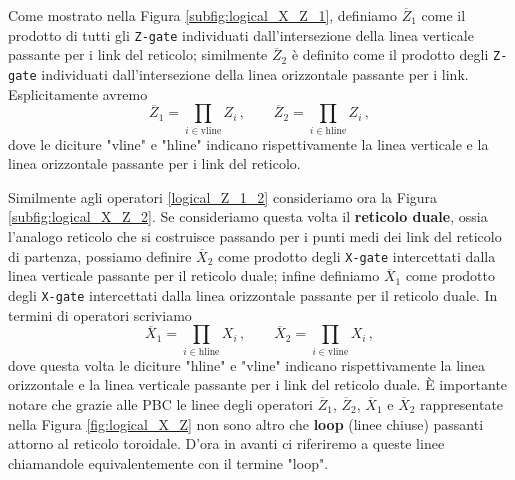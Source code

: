 \noindent Come mostrato nella Figura \ref{subfig:logical_X_Z_1}, definiamo $\overline{Z}_1$ come il prodotto di tutti gli \texttt{Z-gate} individuati dall'intersezione della linea verticale passante per i link del reticolo; similmente $\overline{Z}_2$ è definito come il prodotto degli \texttt{Z-gate} individuati dall'intersezione della linea orizzontale passante per i link. Esplicitamente avremo
\begin{equation}\label{logical_Z_1_2}
    \overline{Z}_1 = \prod_{i \in \text{vline}} Z_i \, , \qquad \overline{Z}_2 = \prod_{i \in \text{hline}} Z_i \, ,
\end{equation}
dove le diciture "vline" e "hline" indicano rispettivamente la linea verticale e la linea orizzontale passante per i link del reticolo. 

\noindent Similmente agli operatori \eqref{logical_Z_1_2} consideriamo ora la Figura \ref{subfig:logical_X_Z_2}. Se consideriamo questa volta il \textbf{reticolo duale}, ossia l'analogo reticolo che si costruisce passando per i punti medi dei link del reticolo di partenza, possiamo definire $\overline{X}_2$ come prodotto degli \texttt{X-gate} intercettati dalla linea verticale passante per il reticolo duale; infine definiamo $\overline{X}_1$ come prodotto degli \texttt{X-gate} intercettati dalla linea orizzontale passante per il reticolo duale. In termini di operatori scriviamo
\begin{equation}\label{logical_X_1_2}
    \overline{X}_1 = \prod_{i \in \text{hline}} X_i \, , \qquad \overline{X}_2 = \prod_{i \in \text{vline}} X_i \, ,
\end{equation}
dove questa volta le diciture "hline" e "vline" indicano rispettivamente la linea orizzontale e la linea verticale passante per i link del reticolo duale. È importante notare che grazie alle PBC le linee degli operatori $\overline{Z}_1$, $\overline{Z}_2$, $\overline{X}_1$ e $\overline{X}_2$ rappresentate nella Figura \ref{fig:logical_X_Z} non sono altro che \textbf{loop} (linee chiuse) passanti attorno al reticolo toroidale. D'ora in avanti ci riferiremo a queste linee chiamandole equivalentemente con il termine "loop".  

